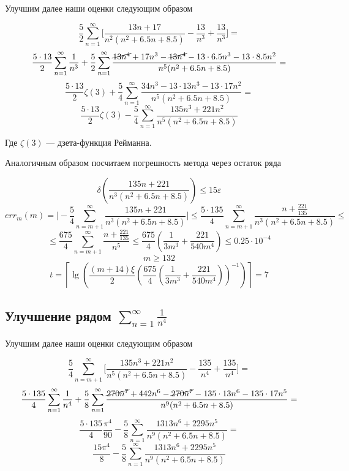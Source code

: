 \documentclass[11pt,a4paper,oneside]{article}
\begin{document}
Улучшим далее наши оценки следующим образом

$$ \frac{5}{2} \sum_{n = 1}^{\infty} \biggr[ \frac{13n + 17}{n^2 (n^2 + 6.5n + 8.5)} - 
	\frac{13}{n^3} + \frac{13}{n^3} \biggr] =$$
$$ \frac{5 \cdot 13}{2} \sum_{n = 1}^{\infty} \frac{1}{n^3} +
	\frac{5}{2} \sum_{n = 1}^{\infty}
	\frac{\cancel{13 n^4} + 17n^3 - \cancel{13 n^4} -
	13 \cdot 6.5 n^3 - 13 \cdot 8.5 n^2}{n^5 (n^2 + 6.5n + 8.5)} = $$
$$ \frac{5 \cdot 13}{2} \zeta(3) +
	\frac{5}{4} \sum_{n = 1}^{\infty}
	\frac{34 n^3 -
	13 \cdot 13 n^3 - 13 \cdot 17 n^2}{n^5 (n^2 + 6.5n + 8.5)} = $$
$$ \frac{5 \cdot 13}{2} \zeta(3) -
	\frac{5}{4} \sum_{n = 1}^{\infty}
	\frac{135 n^3 + 221 n^2}{n^5 (n^2 + 6.5n + 8.5)}$$
	
Где $\zeta(3)$ --- дзета-функция Рейманна.
	
Аналогичным образом посчитаем погрешность метода через остаток ряда

$$ \delta\left( \frac{135 n + 221}{n^3 (n^2 + 6.5n + 8.5)} \right) \le 15 \varepsilon $$
$$ err_{m}(m) = \biggr| - \frac{5}{4} \sum_{n = m + 1}^{\infty}
		\frac{135 n + 221}{n^3 (n^2 + 6.5n + 8.5)} \biggr|
	\le \frac{5 \cdot 135}{4} \sum_{n = m + 1}^{\infty}
		\frac{n + \frac{221}{135}}{n^3 (n^2 + 6.5n + 8.5)} \le $$
$$ \le \frac{675}{4} \sum_{n = m + 1}^{\infty}
		\frac{n + \frac{221}{135}}{n^5}
	\le \frac{675}{4} \left( \frac{1}{3 m^3} + \frac{221}{540 m^4} \right) \le 0.25 \cdot 10^{-4} $$
$$ m \ge 132 $$
$$ t = \left\lceil \lg\left(
	\frac{(m + 14)\xi}{2} \left(
		\frac{675}{4} \left( \frac{1}{3 m^3} + \frac{221}{540 m^4} \right)
	\right)^{-1} \right) \right\rceil = 7 $$
		
\subsection{Улучшение рядом $ \sum_{n = 1}^{\infty} \frac{1}{n^4} $}
		
Улучшим далее наши оценки следующим образом

$$ \frac{5}{4} \sum_{n = m + 1}^{\infty}
	\biggr[ \frac{135 n^3 + 221 n^2}{n^5 (n^2 + 6.5n + 8.5)} - 
	\frac{135}{n^4} + \frac{135}{n^4} \biggr] =$$
$$ \frac{5 \cdot 135}{4} \sum_{n = 1}^{\infty} \frac{1}{n^4} +
	\frac{5}{8} \sum_{n = 1}^{\infty}
	\frac{\cancel{270 n^7} + 442 n^6 - \cancel{270 n^7} -
		135 \cdot 13 n^6 - 135 \cdot 17 n^5}{n^9 (n^2 + 6.5n + 8.5)} = $$
$$ \frac{5 \cdot 135}{4} \frac{\pi^4}{90} -
	\frac{5}{8} \sum_{n = 1}^{\infty}
	\frac{1313 n^6 + 2295 n^5}{n^9 (n^2 + 6.5n + 8.5)} = $$
$$ \frac{15 \pi^4}{8} -
	\frac{5}{8} \sum_{n = 1}^{\infty}
	\frac{1313 n^6 + 2295 n^5}{n^9 (n^2 + 6.5n + 8.5)} $$
\end{document}
